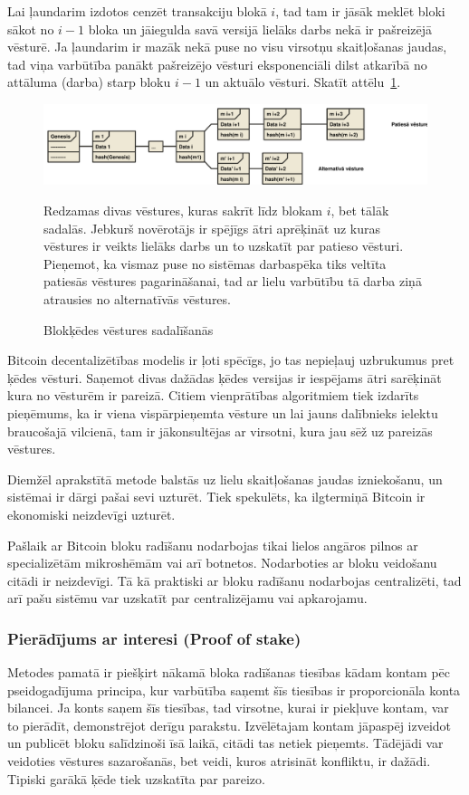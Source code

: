 Lai ļaundarim izdotos cenzēt transakciju blokā $i$, tad tam ir jāsāk meklēt bloki sākot no $i-1$ bloka un jāiegulda savā versijā lielāks darbs nekā ir pašreizējā vēsturē. Ja ļaundarim ir mazāk nekā puse no visu virsotņu skaitļošanas jaudas, tad viņa varbūtība panākt pašreizējo vēsturi eksponenciāli dilst atkarībā no attāluma (darba) starp bloku $i-1$ un aktuālo vēsturi.\cite{nakamoto08}
Skatīt attēlu~\ref{fig:two-histories}.
\begin{figure}[htpb]
    \centering
    \includegraphics[scale=0.4]{teorija/two-histories.pdf}
    \caption{Blokķēdes vēstures sadalīšanās}
    Redzamas divas vēstures, kuras sakrīt līdz blokam $i$, bet tālāk sadalās.
    Jebkurš novērotājs ir spējīgs ātri aprēķināt uz kuras vēstures ir veikts lielāks darbs un to uzskatīt par patieso vēsturi. Pieņemot, ka vismaz puse no sistēmas darbaspēka tiks veltīta patiesās vēstures pagarināšanai, tad ar lielu varbūtību tā darba ziņā atrausies no alternatīvās vēstures.
\label{fig:two-histories}
\end{figure}

Bitcoin decentalizētības modelis ir ļoti spēcīgs, jo tas nepieļauj uzbrukumus pret ķēdes vēsturi. Saņemot divas dažādas ķēdes versijas ir iespējams ātri sarēķināt kura no vēsturēm ir pareizā. Citiem vienprātības algoritmiem tiek izdarīts pieņēmums, ka ir viena vispārpieņemta vēsture un lai jauns dalībnieks ielektu braucošajā vilcienā, tam ir jākonsultējas ar virsotni, kura jau sēž uz pareizās vēstures.

Diemžēl aprakstītā metode balstās uz lielu skaitļošanas jaudas izniekošanu, un sistēmai ir dārgi pašai sevi uzturēt. Tiek spekulēts, ka ilgtermiņā Bitcoin ir ekonomiski neizdevīgi uzturēt. %

Pašlaik ar Bitcoin bloku radīšanu nodarbojas tikai lielos angāros pilnos ar specializētām mikroshēmām vai arī botnetos. Nodarboties ar bloku veidošanu citādi ir neizdevīgi. Tā kā praktiski ar bloku radīšanu nodarbojas centralizēti, tad arī pašu sistēmu var uzskatīt par centralizējamu vai apkarojamu.

\subsubsection{Pierādījums ar interesi (Proof of stake)}
Metodes pamatā ir piešķirt nākamā bloka radīšanas tiesības kādam kontam pēc pseidogadījuma principa, kur varbūtība saņemt šīs tiesības ir proporcionāla konta bilancei. Ja konts saņem šīs tiesības, tad virsotne, kurai ir piekļuve kontam, var to pierādīt, demonstrējot derīgu parakstu. Izvēlētajam kontam jāpaspēj izveidot un publicēt bloku salīdzinoši īsā laikā, citādi tas netiek pieņemts. Tādējādi var veidoties vēstures sazarošanās, bet veidi, kuros atrisināt konfliktu, ir dažādi. Tipiski garākā ķēde tiek uzskatīta par pareizo.

